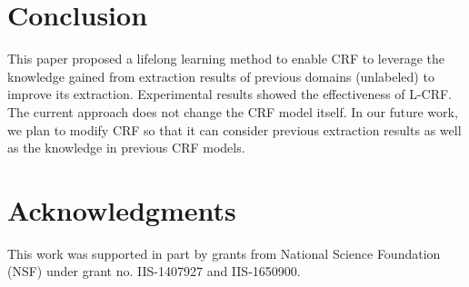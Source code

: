 \documentclass[11pt,a4paper]{article}
\theoremstyle{definition}
\begin{document}
    \section{Conclusion}
    
    This paper proposed a lifelong learning method to enable CRF to leverage the knowledge gained from extraction results of previous domains (unlabeled) to improve its extraction. Experimental results showed the effectiveness of L-CRF. The current approach does not change the CRF model itself. In our future work, we plan to modify CRF so that it can consider previous extraction results as well as the knowledge in previous CRF models. 
    
\section*{Acknowledgments} 
This work was supported in part by grants from National Science Foundation (NSF) under grant no. IIS-1407927 and IIS-1650900. 
    
    
    
    
\end{document}
